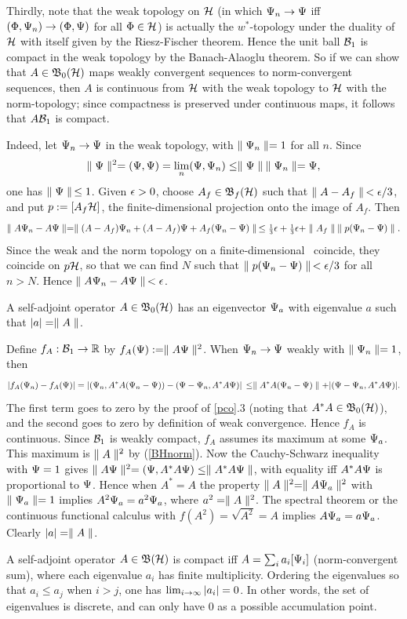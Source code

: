 Thirdly, note that the weak topology on ${\cal H}$ (in which $\Psi_n\rightarrow\Psi$
iff $(\Phi,\Psi_n)\rightarrow (\Phi,\Psi)$ for all $\Phi\in{\cal H}$) is actually the
$w^*$-topology under the duality of ${\cal H}$ with itself given by the
Riesz-Fischer theorem. Hence the unit ball ${\cal B}_1$ is compact in
the weak topology by the Banach-Alaoglu theorem. So if we can show
that $A\in{\frak B}_0({\cal H})$ maps weakly convergent sequences to norm-convergent
sequences, then $A$ is continuous from ${\cal H}$ with the weak topology to
${\cal H}$ with the norm-topology; since compactness is preserved under
continuous maps, it follows that $A{\cal B}_1$ is compact.
 
Indeed, let $\Psi_n\rightarrow\Psi$ in the weak topology, with $\parallel\Psi_n\parallel=1$
for all $n$.  Since $$ \parallel\Psi\parallel^2=(\Psi,\Psi)=\lim_n (\Psi,\Psi_n)\leq
\parallel\Psi\parallel\:\parallel\Psi_n\parallel=\Psi,
$$ 
one has $\parallel\Psi\parallel\,\leq 1$.  Given $\epsilon>0$, choose $A_f\in{\frak B}_f({\cal H})$
 such that $\parallel A-A_f\parallel\,<\epsilon/3$, and put $p:=[A_f{\cal H}]$, the
 finite-dimensional projection onto the image of $A_f$. Then
$$
\parallel A\Psi_n-A\Psi\parallel=\parallel (A-A_f)\Psi_n + (A-A_f)\Psi+ A_f(\Psi_n-\Psi)\parallel\,\leq
\mbox{\footnotesize $\frac{1}{3}$}\epsilon+\mbox{\footnotesize $\frac{1}{3}$}\epsilon+\parallel A_f\parallel\: \parallel p(\Psi_n-\Psi)\parallel.
$$
Since the weak and the norm topology on a finite-dimensional \Hs\
coincide, they coincide on $p{\cal H}$, so that we can find $N$ such that
$\parallel p(\Psi_n-\Psi)\parallel\,<\epsilon/3$ for all $n>N$.  Hence $\parallel
A\Psi_n-A\Psi\parallel\,<\epsilon$.\enp
\begin{Corollary}
A self-adjoint operator $A\in{\frak B}_0({\cal H})$ has an eigenvector $\Psi_a$ with
eigenvalue $a$ such that $|a|=\parallel A\parallel$.
\end{Corollary}

Define $f_A:{\cal B}_1\rightarrow{\Bbb R}$ by $f_A(\Psi):=\parallel A\Psi\parallel^2$. When
$\Psi_n\rightarrow\Psi$ weakly with $\parallel\Psi_n\parallel=1$, then
$$
|f_A(\Psi_n)-f_A(\Psi)|=| (\Psi_n,A^*A(\Psi_n-\Psi))-(\Psi-\Psi_n,A^*A\Psi)|
\,\leq \parallel A^*A (\Psi_n-\Psi)\parallel+ |(\Psi-\Psi_n,A^*A\Psi)|.
$$
The first term goes to zero by the proof of \ref{pco}.3 (noting that
 $A^*A\in{\frak B}_0({\cal H})$), and the second goes to zero by definition of weak
 convergence. Hence $f_A$ is continuous.  Since ${\cal B}_1$ is weakly
 compact, $f_A$ assumes its maximum at some $\Psi_a$. This maximum is
 $\parallel A\parallel^2$ by (\ref{BHnorm}). Now the Cauchy-Schwarz inequality with
 $\Psi=1$ gives $\parallel A\Psi\parallel^2=(\Psi, A^*A\Psi)\leq \parallel A^*A\Psi\parallel$, with
 equality iff $A^*A\Psi$ is proportional to $\Psi$. Hence when $A^*=A$
 the property $\parallel A\parallel^2=\parallel A\Psi_a\parallel^2$ with $\parallel\Psi_a\parallel=1$ implies
 $A^2\Psi_a=a^2\Psi_a$, where $a^2=\parallel A\parallel^2$.  The spectral theorem or
 the continuous functional calculus with $f(A^2)=\sqrt{A^2}=A$ implies
 $A\Psi_a=a\Psi_a$. Clearly $|a|=\parallel A\parallel$.  \enp
\begin{Theorem}
A self-adjoint operator $A\in{\frak B}({\cal H})$ is compact iff $A=\sum_i a_i
[\Psi_i]$ (norm-convergent sum), where each eigenvalue $a_i$ has finite
multiplicity. Ordering the eigenvalues so that $a_i\leq a_j$ when
$i>j$, one has $\lim_{i\rightarrow\infty} |a_i|=0$. In other words, the set
of eigenvalues is discrete, and can only have 0 as a possible
accumulation point.
\end{Theorem}

